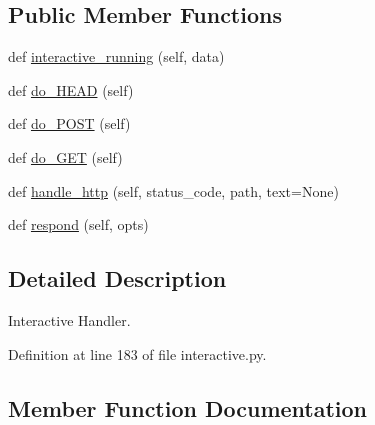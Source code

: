 \subsection*{Public Member Functions}
\begin{DoxyCompactItemize}
\item 
def \hyperlink{classprojects_1_1personality__captions_1_1interactive_1_1MyHandler_ae58a0c4c564f54a29ff85afa26086e47}{interactive\+\_\+running} (self, data)
\item 
def \hyperlink{classprojects_1_1personality__captions_1_1interactive_1_1MyHandler_a51c600da08cf2f01d860f4a4c500e827}{do\+\_\+\+H\+E\+AD} (self)
\item 
def \hyperlink{classprojects_1_1personality__captions_1_1interactive_1_1MyHandler_a846c973c3c91308218b79f84396265ac}{do\+\_\+\+P\+O\+ST} (self)
\item 
def \hyperlink{classprojects_1_1personality__captions_1_1interactive_1_1MyHandler_a52eec9579c85ca0497df9cbe773f729c}{do\+\_\+\+G\+ET} (self)
\item 
def \hyperlink{classprojects_1_1personality__captions_1_1interactive_1_1MyHandler_aa0900ea1f19ecd9cd9bf0ae93ce1028e}{handle\+\_\+http} (self, status\+\_\+code, path, text=None)
\item 
def \hyperlink{classprojects_1_1personality__captions_1_1interactive_1_1MyHandler_a990c770086f0596dde94fc2a84e76d90}{respond} (self, opts)
\end{DoxyCompactItemize}


\subsection{Detailed Description}
\begin{DoxyVerb}Interactive Handler.
\end{DoxyVerb}
 

Definition at line 183 of file interactive.\+py.



\subsection{Member Function Documentation}
\mbox{\label{classprojects_1_1personality__captions_1_1interactive_1_1MyHandler_a52eec9579c85ca0497df9cbe773f729c}} 

